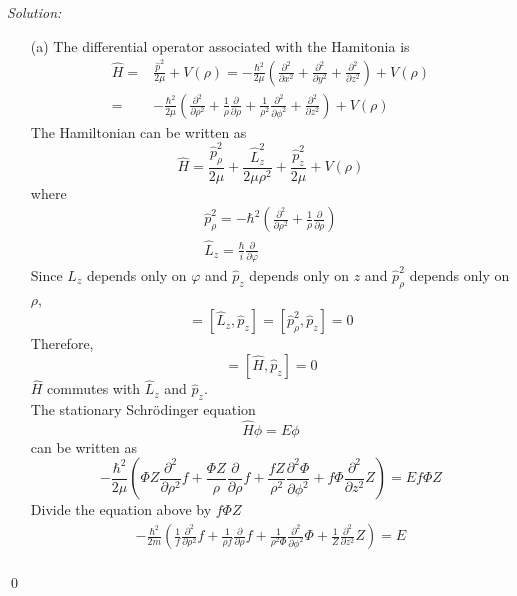 \documentclass[10pt,a4paper]{article}
\newenvironment{sol}
    {\emph{Solution:}
    }
    {
    \qed
    }
\begin{document}
\begin{sol}
\begin{itemize}
\item[(a)] The differential operator associated with the Hamitonia is
\begin{align}
\nonumber\hat{H}=&\frac{\hat{p}^2}{2\mu}+V(\rho)=-\frac{\hbar^2}{2\mu}(\frac{\partial^2}{\partial x^2}+\frac{\partial^2}{\partial y^2}+\frac{\partial^2}{\partial z^2})+V(\rho)\\
=&-\frac{\hbar^2}{2\mu}(\frac{\partial^2}{\partial\rho^2}+\frac{1}{\rho}\frac{\partial}{\partial\rho}+\frac{1}{\rho^2}\frac{\partial^2}{\partial\phi^2}+\frac{\partial^2}{\partial z^2})+V(\rho)
\end{align}
The Hamiltonian can be written as
\begin{equation}
\hat{H}=\frac{\hat{p}_{\rho}^2}{2\mu}+\frac{\hat{L}_z^2}{2\mu\rho^2}+\frac{\hat{p}_z^2}{2\mu}+V(\rho)
\end{equation}
where
\begin{gather}
\hat{p}_{\rho}^2=-\hbar^2(\frac{\partial^2}{\partial\rho^2}+\frac{1}{\rho}\frac{\partial}{\partial\rho})\\
\hat{L}_z=\frac{\hbar}{i}\frac{\partial}{\partial\varphi}
\end{gather}
Since $L_z$ depends only on $\varphi$ and $\hat{p}_z$ depends only on $z$ and $\hat{p}_{\rho}^2$ depends only on $\rho$,
\begin{equation}
[\hat{L}_z,\hat{p}_{\rho}^2]=[\hat{L}_z,\hat{p}_z]=[\hat{p}_{\rho}^2,\hat{p}_z]=0
\end{equation}
Therefore,
\begin{equation}
[\hat{H},\hat{L}_z]=[\hat{H},\hat{p}_z]=0
\end{equation}
$\hat{H}$ commutes with $\hat{L}_z$ and $\hat{p}_z$.\\
The stationary Schrödinger equation
\begin{equation}
\hat{H}\phi=E\phi
\end{equation}
can be written as
\begin{equation}
-\frac{\hbar^2}{2\mu}(\Phi Z\frac{\partial^2}{\partial\rho^2}f+\frac{\Phi Z}{\rho}\frac{\partial}{\partial\rho}f+\frac{fZ}{\rho^2}\frac{\partial^2\Phi}{\partial\phi^2}+f\Phi\frac{\partial^2}{\partial z^2}Z)=Ef\Phi Z
\end{equation}
Divide the equation above by $f\Phi Z$
\begin{gather}
-\frac{\hbar^2}{2m}(\frac{1}{f}\frac{\partial^2}{\partial\rho^2}f+\frac{1}{\rho f}\frac{\partial}{\partial\rho}f+\frac{1}{\rho^2\Phi}\frac{\partial^2}{\partial\phi^2}\Phi+\frac{1}{Z}\frac{\partial^2}{\partial z^2}Z)=E\\

\end{gather}
\end{itemize}
\end{sol}
\end{document}
